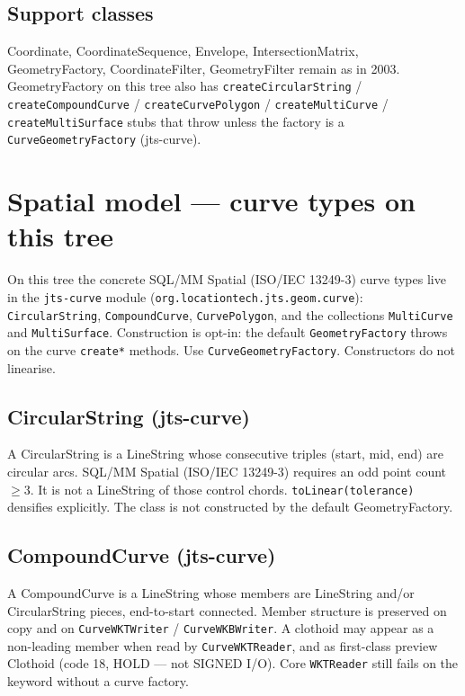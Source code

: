 \documentclass[11pt]{article}
\begin{document}
\subsection{Support classes}
Coordinate, CoordinateSequence, Envelope, IntersectionMatrix,
GeometryFactory, CoordinateFilter, GeometryFilter remain as in 2003.
GeometryFactory on this tree also has
\texttt{createCircularString} / \texttt{createCompoundCurve} /
\texttt{createCurvePolygon} / \texttt{createMultiCurve} /
\texttt{createMultiSurface} stubs that throw unless the factory is a
\texttt{CurveGeometryFactory} (jts-curve).

\section{Spatial model --- curve types on this tree}
On this tree the concrete SQL/MM Spatial (ISO/IEC 13249-3) curve
types live in the
\texttt{jts-curve} module
(\texttt{org.locationtech.jts.geom.curve}):
\texttt{CircularString}, \texttt{CompoundCurve},
\texttt{CurvePolygon}, and the collections \texttt{MultiCurve} and
\texttt{MultiSurface}. Construction is opt-in: the default
\texttt{GeometryFactory} throws on the curve \texttt{create*}
methods. Use \texttt{CurveGeometryFactory}. Constructors do not
linearise.

\subsection{CircularString (jts-curve)}
A CircularString is a LineString whose consecutive triples (start,
mid, end) are circular arcs. SQL/MM Spatial (ISO/IEC 13249-3)
requires an odd point count
$\ge 3$. It is not a LineString of those control chords.
\texttt{toLinear(tolerance)} densifies explicitly. The class is not
constructed by the default GeometryFactory.

\subsection{CompoundCurve (jts-curve)}
A CompoundCurve is a LineString whose members are LineString and/or
CircularString pieces, end-to-start connected. Member structure is
preserved on copy and on \texttt{CurveWKTWriter} /
\texttt{CurveWKBWriter}. A clothoid may appear as a non-leading
member when read by \texttt{CurveWKTReader}, and as first-class
preview Clothoid (code 18, HOLD --- not SIGNED I/O). Core
\texttt{WKTReader} still fails on the keyword without a curve factory.
\end{document}
